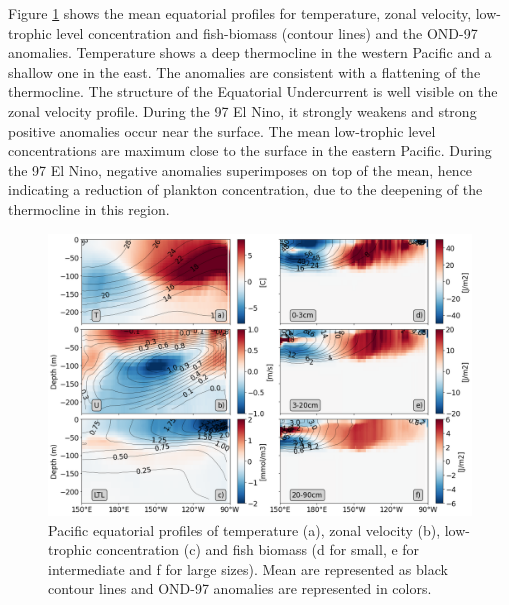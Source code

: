 Figure \ref{fig:profiles} shows the mean equatorial profiles for temperature, zonal velocity, low-trophic level concentration and fish-biomass (contour lines) and the OND-97 anomalies. Temperature shows a deep thermocline in the western Pacific and a shallow one in the east. The anomalies are consistent with a flattening of the thermocline. The structure of the Equatorial Undercurrent is well visible on the zonal velocity profile. During the 97 El Nino, it strongly weakens and strong positive anomalies occur near the surface. The mean low-trophic level concentrations are maximum close to the surface in the eastern Pacific. During the 97 El Nino, negative anomalies superimposes on top of the mean, hence indicating a reduction of plankton concentration, due to the deepening of the thermocline in this region.
\begin{figure}
	\centering
	\includegraphics[scale=0.4]{figs/fig4.png}	
	\caption{Pacific equatorial profiles of temperature (a), zonal velocity (b), low-trophic concentration (c) and fish biomass (d for small, e for intermediate and f for large sizes). Mean are represented as black contour lines and OND-97 anomalies are represented in colors.}	
	\label{fig:profiles}
\end{figure}

